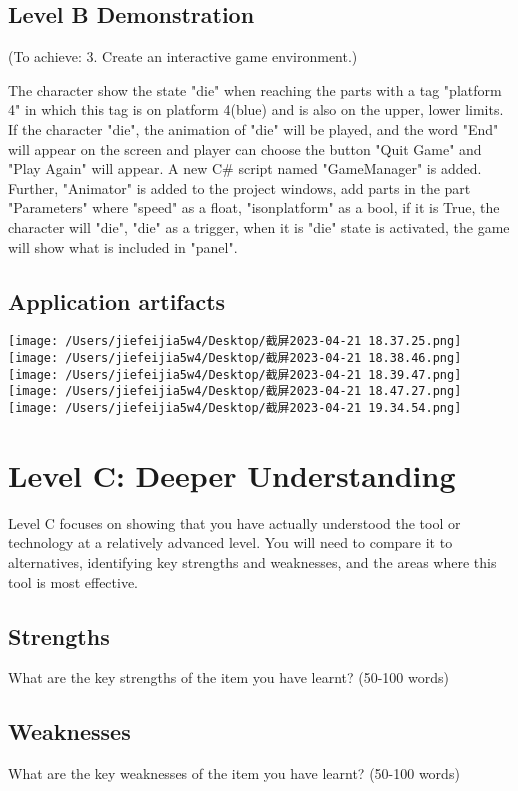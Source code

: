 \documentclass[a4paper, 11pt]{report}
\begin{document}
\subsection{Level B Demonstration}
(To achieve: 3. Create an interactive game environment.)

The character show the state "die" when reaching the parts with a tag "platform 4" in which this tag is on platform 4(blue) and is also on the upper, lower limits.  If the character "die", the animation of "die" will be played,  and the word "End" will appear on the screen and player can choose the button "Quit Game" and "Play Again" will appear. 
A new C\# script named "GameManager" is added.  Further,  "Animator" is added to the project windows,  add parts in the part "Parameters" where "speed" as a float, "isonplatform" as a bool,  if it is True, the character will "die", "die" as a trigger, when it is "die" state is activated, the game will show what is included in "panel".
\subsection{Application artifacts}
\newpage
\texttt{[image: /Users/jiefeijia5w4/Desktop/截屏2023-04-21 18.37.25.png]}
\texttt{[image: /Users/jiefeijia5w4/Desktop/截屏2023-04-21 18.38.46.png]}
\texttt{[image: /Users/jiefeijia5w4/Desktop/截屏2023-04-21 18.39.47.png]}
\texttt{[image: /Users/jiefeijia5w4/Desktop/截屏2023-04-21 18.47.27.png]}
\texttt{[image: /Users/jiefeijia5w4/Desktop/截屏2023-04-21 19.34.54.png]}



\newpage
\section{Level C: Deeper Understanding}

Level C focuses on showing that you have actually understood the tool or technology at a relatively advanced level. You will need to compare it to alternatives, identifying key strengths and weaknesses, and the areas where this tool is most effective. 

\subsection{Strengths}
What are the key strengths of the item you have learnt? (50-100 words)

\subsection{Weaknesses}
What are the key weaknesses of the item you have learnt? (50-100 words)
\end{document}
